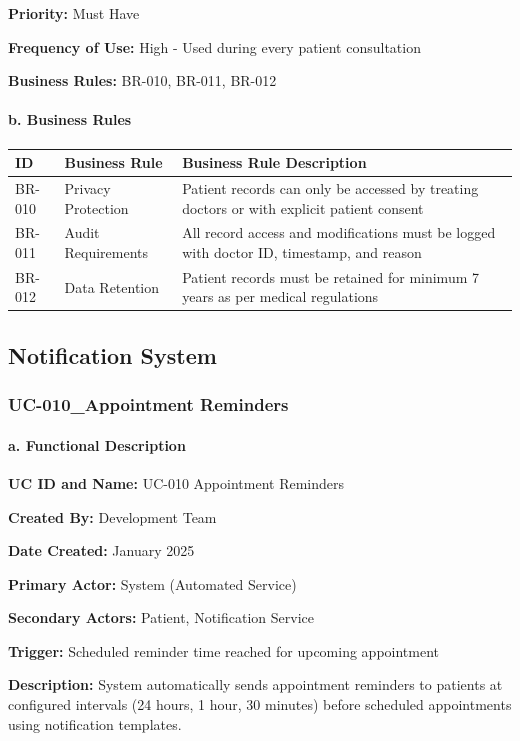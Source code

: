 \documentclass[12pt,a4paper]{article}
\begin{document}
\textbf{Priority:} Must Have

\textbf{Frequency of Use:} High - Used during every patient consultation

\textbf{Business Rules:} BR-010, BR-011, BR-012

\paragraph{b. Business Rules}

\begin{longtable}{|p{2cm}|p{4cm}|p{8cm}|}
\hline
\textbf{ID} & \textbf{Business Rule} & \textbf{Business Rule Description} \\
\hline
BR-010 & Privacy Protection & Patient records can only be accessed by treating doctors or with explicit patient consent \\
\hline
BR-011 & Audit Requirements & All record access and modifications must be logged with doctor ID, timestamp, and reason \\
\hline
BR-012 & Data Retention & Patient records must be retained for minimum 7 years as per medical regulations \\
\hline
\end{longtable}

\subsection{Notification System}

\subsubsection{UC-010\_Appointment Reminders}

\paragraph{a. Functional Description}

\textbf{UC ID and Name:} UC-010 Appointment Reminders

\textbf{Created By:} Development Team

\textbf{Date Created:} January 2025

\textbf{Primary Actor:} System (Automated Service)

\textbf{Secondary Actors:} Patient, Notification Service

\textbf{Trigger:} Scheduled reminder time reached for upcoming appointment

\textbf{Description:} System automatically sends appointment reminders to patients at configured intervals (24 hours, 1 hour, 30 minutes) before scheduled appointments using notification templates.
\end{document}
